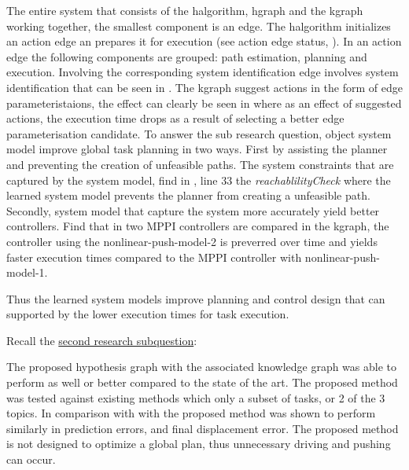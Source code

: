 The entire system that consists of the \ac{halgorithm}, \ac{hgraph} and the \ac{kgraph} working together, the smallest component is an edge. The \ac{halgorithm} initializes an action edge an prepares it for execution (see action edge status, ). In an action edge the following components are grouped: path estimation, planning and execution. Involving the corresponding system identification edge involves system identification that can be seen in . The \ac{kgraph} suggest actions in the form of edge parameteristaions, the effect can clearly be seen in  where as an effect of suggested actions, the execution time drops as a result of selecting a better edge parameterisation candidate. To answer the sub research question, object system model improve global task planning in two ways. First by assisting the planner and preventing the creation of unfeasible paths. The system constraints that are captured by the system model, find in , line 33 the \textit{reachablilityCheck} where the learned system model prevents the planner from creating a unfeasible path. Secondly, system model that capture the system more accurately yield better controllers. Find that in  two \ac{MPPI} controllers are compared in the \ac{kgraph}, the controller using the nonlinear-push-model-2 is preverred over time and yields faster execution times compared to the \ac{MPPI} controller with nonlinear-push-model-1.\bs

Thus the learned system models improve planning and control design that can supported by the lower execution times for task execution.\bs

\noindent Recall the \hyperref[researchsubquestion:does_it_compare]{second research subquestion}:\vspace{0.5\baselineskip}\\
\textit{}\vspace{0.5\baselineskip}


The proposed hypothesis graph with the associated knowledge graph was able to perform as well or better compared to the state of the art. The proposed method was tested against existing methods which only a subset of tasks, or 2 of the 3 topics. In comparison with with\cite{sabbaghnovin_model_2021} the proposed method was shown to perform similarly in prediction errors, and final displacement error. The proposed method is not designed to optimize a global plan, thus unnecessary driving and pushing can occur. 
\vspace{\baselineskip}







